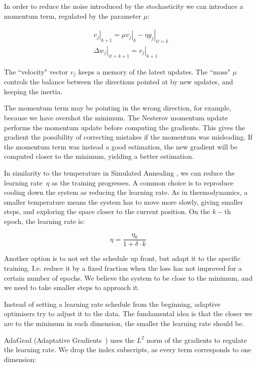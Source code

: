 In order to reduce the noise introduced by the stochasticity we can introduce a momentum term, regulated by the parameter $\mu$:

\begin{align*}
&\left.v_j\right|_{k+1} = \mu \left. v_j\right|_{k} - \left.\eta g_j\right|_{it=k}\\
&\left.\Delta w_j\right|_{it=k+1} = \left.v_j\right|_{k+1}
\end{align*}

The ``velocity" vector $v_j$ keeps a memory of the latest updates.
The ``mass" $\mu$ controls the balance between the directions pointed at by new updates, and keeping the inertia.

The momentum term 
may be pointing in the wrong direction, for example, because we have overshot the minimum.
The Nesterov momentum update~\citep{nag} performs the momentum update before computing the gradients.
This gives the gradient the possibility of correcting mistakes if the momentum was misleading.
If the momentum term was instead a good estimation, the new gradient will be computed closer to the minimum, yielding a better estimation.

In similarity 
to the temperature in Simulated Annealing \citep{genSA}, we can reduce the learning rate~$\eta$ as the training progresses.
A common choice is to reproduce cooling down the system as reducing the learning rate.
As in thermodynamics, a smaller temperature means the system has to move more slowly, giving smaller steps, and exploring the space closer to the current position.
On the $k-$th epoch, the learning rate is:

\begin{equation}
\eta= \frac{\eta_0}{1 + \delta \cdot k}
\end{equation}

Another option is to not set the schedule up front, but adapt it to the specific training.
I.e. reduce it by a fixed fraction when the loss has not improved for a certain number of epochs.
We believe the system to be close to the minimum, and we need to take smaller steps to approach it.

Instead of setting a learning rate schedule from the beginning, adaptive optimisers try to adjust it to the data.
The fundamental idea is that the closer we are to the minimum in each dimension, the smaller the learning rate should be.

AdaGrad (Adaptative Gradients~\citep{adagrad}) uses the $L^2$ norm of the gradients to regulate the learning rate.
We drop the index subscripts, as every term corresponds to one dimension:

